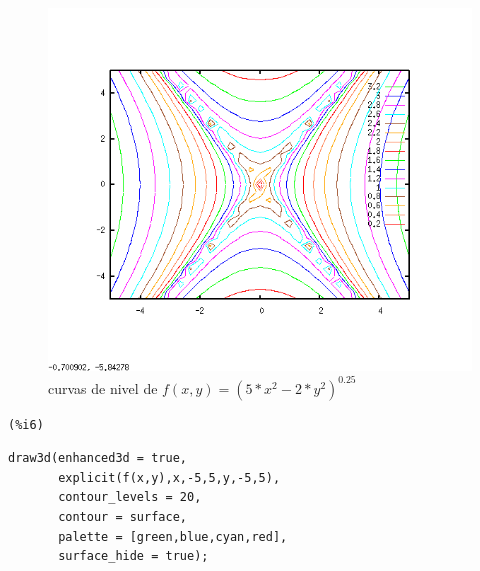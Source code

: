 \documentclass[12pt]{article}
\begin{document}
\begin{figure}[H]
\centering
\includegraphics[scale=0.5]{5.png}
\caption{curvas de nivel de $f(x,y)= (5*x^2-2*y^2)^0.25$ }
\end{figure}

\noindent
\begin{minipage}[t]{8ex}{\color{red}\bf
\begin{verbatim}
(%i6) 
\end{verbatim}}
\end{minipage}
\begin{minipage}[t]{\textwidth}{\color{blue}
\begin{verbatim}
draw3d(enhanced3d = true,
       explicit(f(x,y),x,-5,5,y,-5,5),
       contour_levels = 20,
       contour = surface,
       palette = [green,blue,cyan,red],
       surface_hide = true);
\end{verbatim}}
\end{minipage}
\end{document}
